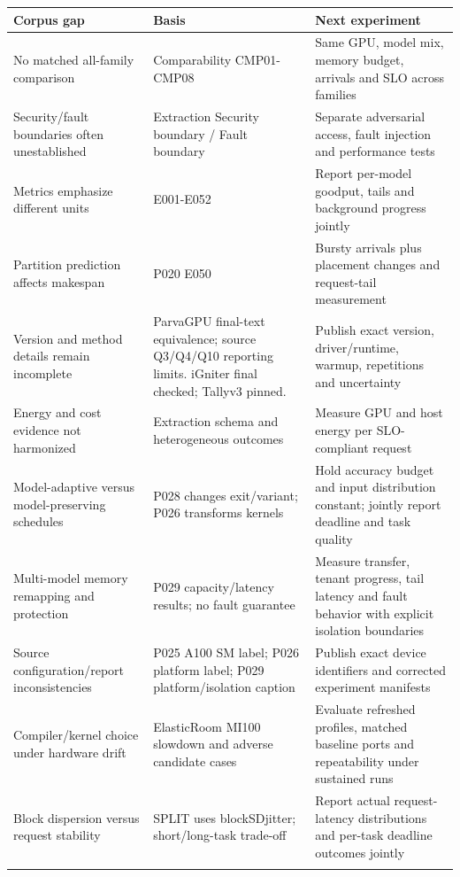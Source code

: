 \begin{longtable}{>{\raggedright\arraybackslash}p{}>{\raggedright\arraybackslash}p{}>{\raggedright\arraybackslash}p{}}
\toprule
\textbf{Corpus gap} & \textbf{Basis} & \textbf{Next experiment}\\\midrule\endhead
No matched all-family comparison & Comparability CMP01-CMP08 & Same GPU, model mix, memory budget, arrivals and SLO across families\\\addlinespace
Security/fault boundaries often unestablished & Extraction Security boundary / Fault boundary & Separate adversarial access, fault injection and performance tests\\\addlinespace
Metrics emphasize different units & E001-E052 & Report per-model goodput, tails and background progress jointly\\\addlinespace
Partition prediction affects makespan & P020 E050 & Bursty arrivals plus placement changes and request-tail measurement\\\addlinespace
Version and method details remain incomplete & ParvaGPU final-text equivalence; source Q3/Q4/Q10 reporting limits. iGniter final checked; Tallyv3 pinned. & Publish exact version, driver/runtime, warmup, repetitions and uncertainty\\\addlinespace
Energy and cost evidence not harmonized & Extraction schema and heterogeneous outcomes & Measure GPU and host energy per SLO-compliant request\\\addlinespace
Model-adaptive versus model-preserving schedules & P028 changes exit/variant; P026 transforms kernels & Hold accuracy budget and input distribution constant; jointly report deadline and task quality\\\addlinespace
Multi-model memory remapping and protection & P029 capacity/latency results; no fault guarantee & Measure transfer, tenant progress, tail latency and fault behavior with explicit isolation boundaries\\\addlinespace
Source configuration/report inconsistencies & P025 A100 SM label; P026 platform label; P029 platform/isolation caption & Publish exact device identifiers and corrected experiment manifests\\\addlinespace
Compiler/kernel choice under hardware drift & ElasticRoom MI100 slowdown and adverse candidate cases & Evaluate refreshed profiles, matched baseline ports and repeatability under sustained runs\\\addlinespace
Block dispersion versus request stability & SPLIT uses blockSDjitter; short/long-task trade-off & Report actual request-latency distributions and per-task deadline outcomes jointly\\\addlinespace

\end{longtable}
